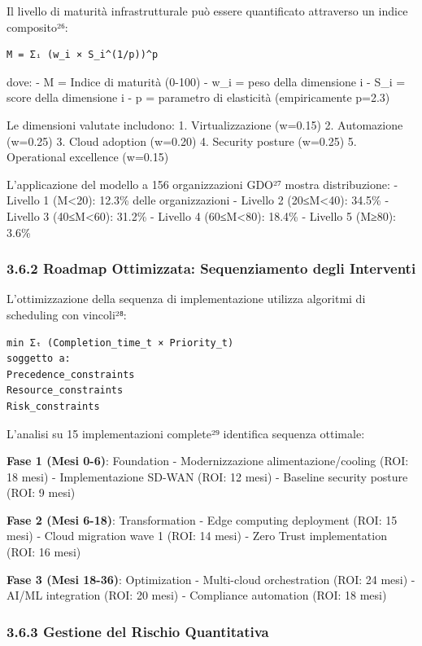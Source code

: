\documentclass{report}
\begin{document}
Il livello di maturità infrastrutturale può essere quantificato
attraverso un indice composito²⁶:

\begin{verbatim}
M = Σᵢ (w_i × S_i^(1/p))^p
\end{verbatim}

dove: - M = Indice di maturità (0-100) - w\_i = peso della dimensione i
- S\_i = score della dimensione i - p = parametro di elasticità
(empiricamente p=2.3)

Le dimensioni valutate includono: 1. Virtualizzazione (w=0.15) 2.
Automazione (w=0.25) 3. Cloud adoption (w=0.20) 4. Security posture
(w=0.25) 5. Operational excellence (w=0.15)

L'applicazione del modello a 156 organizzazioni GDO²⁷ mostra
distribuzione: - Livello 1 (M\textless20): 12.3\% delle organizzazioni -
Livello 2 (20≤M\textless40): 34.5\% - Livello 3 (40≤M\textless60):
31.2\% - Livello 4 (60≤M\textless80): 18.4\% - Livello 5 (M≥80): 3.6\%

\subsubsection{3.6.2 Roadmap Ottimizzata: Sequenziamento degli
Interventi}\label{roadmap-ottimizzata-sequenziamento-degli-interventi}

L'ottimizzazione della sequenza di implementazione utilizza algoritmi di
scheduling con vincoli²⁸:

\begin{verbatim}
min Σₜ (Completion_time_t × Priority_t)
soggetto a:
Precedence_constraints
Resource_constraints
Risk_constraints
\end{verbatim}

L'analisi su 15 implementazioni complete²⁹ identifica sequenza ottimale:

\textbf{Fase 1 (Mesi 0-6)}: Foundation - Modernizzazione
alimentazione/cooling (ROI: 18 mesi) - Implementazione SD-WAN (ROI: 12
mesi) - Baseline security posture (ROI: 9 mesi)

\textbf{Fase 2 (Mesi 6-18)}: Transformation - Edge computing deployment
(ROI: 15 mesi) - Cloud migration wave 1 (ROI: 14 mesi) - Zero Trust
implementation (ROI: 16 mesi)

\textbf{Fase 3 (Mesi 18-36)}: Optimization - Multi-cloud orchestration
(ROI: 24 mesi) - AI/ML integration (ROI: 20 mesi) - Compliance
automation (ROI: 18 mesi)

\subsubsection{3.6.3 Gestione del Rischio
Quantitativa}\label{gestione-del-rischio-quantitativa}
\end{document}
